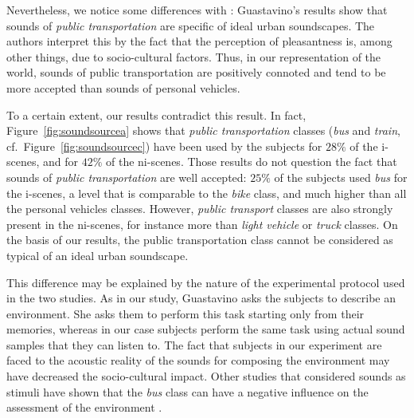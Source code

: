 \documentclass[12pt]{elsarticle}
\newcommand{\cf}{cf.}
\begin{document}
Nevertheless, we notice some differences with \cite{guastavino2006ideal}: Guastavino’s results show that sounds of \emph{public transportation} are specific of ideal urban soundscapes. The authors interpret this by the fact that the perception of pleasantness is, among other things, due to socio-cultural factors. Thus, in our representation of the world, sounds of public transportation are positively connoted and tend to be more accepted than sounds of personal vehicles.

To a certain extent, our results contradict this result. In fact,  Figure~\ref{fig:soundsourcea} shows that \emph{public transportation} classes (\emph{bus} and \emph{train}, \cf~Figure~\ref{fig:soundsourcec}) have been used by the subjects for $28\%$ of the i-scenes, and for $42\%$ of the ni-scenes. Those results do not question the fact that sounds of \emph{public transportation} are well accepted: $25\%$ of the subjects used \emph{bus} for the i-scenes, a level that is comparable to the \emph{bike} class, and much higher than all the personal vehicles classes. However, \emph{public transport} classes are also strongly present in the ni-scenes, for instance more than \emph{light vehicle} or \emph{truck} classes. On the basis of our results, the public transportation class cannot be considered as typical of an ideal urban soundscape.


This difference may be explained by the nature of the experimental protocol used in the two studies. As in our study, Guastavino asks the subjects to describe an environment. She asks them to perform this task starting only from their memories, whereas in our case subjects perform the same task using actual sound samples that they can listen to. The fact that subjects in our experiment are faced to the acoustic reality of the sounds for composing the environment may have decreased the socio-cultural impact. Other studies that considered sounds as stimuli have shown that the \emph{bus} class can have a negative influence on the assessment of the environment \cite{lavandier2006contribution}.
\end{document}
